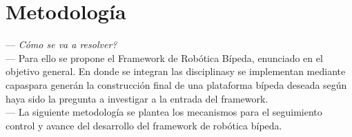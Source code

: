 \documentclass[10pt,letterpaper,oneside,onecolumn]{article}
\newcommand{\anext}{\quad[\quad$\rhd$\quad]}
\begin{document}
{  \section{Metodolog\'ia}
  \label{sec:metodologia}

  --- \emph{C\'omo se va a resolver?}\anext\\
  --- Para ello se propone el Framework de Rob\'otica B\'ipeda, enunciado en el objetivo general. En donde se integran las disciplinas\anext\quad y se implementan mediante capas\anext\quad para gener\'an la construcci\'on final de una plataforma b\'ipeda deseada seg\'un haya sido la pregunta a investigar a la entrada del framework\anext.\anext\\
  --- La siguiente metodolog\'ia se plantea los mecanismos para el seguimiento control y avance del desarrollo del framework de rob\'otica b\'ipeda.\anext\\
}
\end{document}
